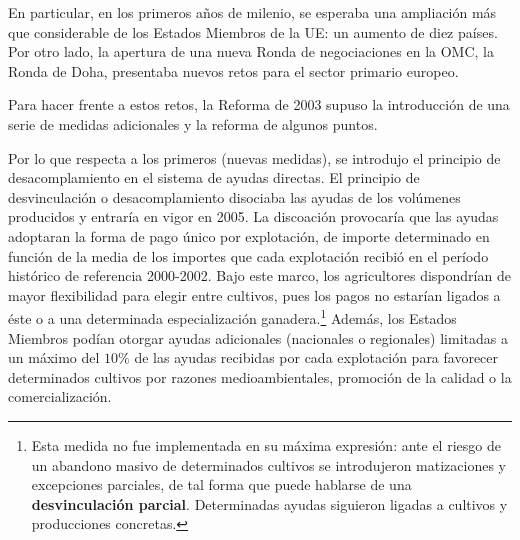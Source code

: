 \documentclass[10pt,a4paper]{article}
\begin{document}
En particular, en los primeros años de milenio, se esperaba una ampliación más que considerable de los Estados Miembros de la UE: un aumento de diez países. Por otro lado, la apertura de una nueva Ronda de negociaciones en la OMC, la Ronda de Doha, presentaba nuevos retos para el sector primario europeo. 

Para hacer frente a estos retos, la Reforma de 2003 supuso la introducción de una serie de medidas adicionales y la reforma de algunos puntos. 


Por lo que respecta a los primeros (nuevas medidas), se introdujo el principio de desacomplamiento en el sistema de ayudas directas. El principio de desvinculación o desacomplamiento disociaba las ayudas de los volúmenes producidos y entraría en vigor en 2005. La discoación provocaría que las ayudas adoptaran la forma de pago único por explotación, de importe determinado en función de la media de los importes que cada explotación recibió en el período histórico de referencia 2000-2002. Bajo este marco, los agricultores dispondrían de mayor flexibilidad para elegir entre cultivos, pues los pagos no estarían ligados a éste o a una determinada especialización ganadera.\footnote{%
    Esta medida no fue implementada en su máxima expresión: ante el riesgo de un abandono masivo de determinados cultivos se introdujeron matizaciones y excepciones parciales, de tal forma que puede hablarse de una \textbf{desvinculación parcial}. Determinadas ayudas siguieron ligadas a cultivos y producciones concretas.
} Además, los Estados Miembros podían otorgar ayudas adicionales (nacionales o regionales) limitadas a un máximo del $10\%$ de las ayudas recibidas por cada explotación para favorecer determinados cultivos por razones medioambientales, promoción de la calidad o la comercialización. 
\end{document}
